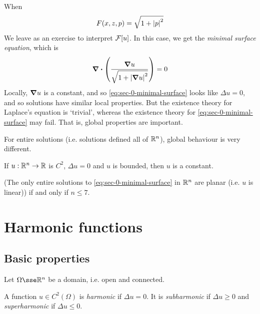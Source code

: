 \documentclass{article}
\begin{document}
\begin{example}
     When
    \[F(x, z, p) = \sqrt{1 + \abs{p}^2}\]
    We leave as an exercise to interpret \(\mathcal{F}[u]\). In this case, we get the \emph{minimal surface equation}, which is
    \begin{equation}
        \label{eq:sec-0-minimal-surface}
        \grad\vdot\left(\frac{\grad u}{\sqrt{1 + \abs{\grad u}^2}}\right) = 0
    \end{equation}
    Locally, \(\grad u\) is a constant, and so \cref{eq:sec-0-minimal-surface} looks like \(\Delta u = 0\), and so solutions have similar local properties. But the existence theory for Laplace's equation is `trivial', whereas the existence theory for \cref{eq:sec-0-minimal-surface} may fail. That is, global properties are important.

    For entire solutions (i.e. solutions defined all of \(\mathbb{R}^n\)), global behaviour is very different.
\end{example}

\begin{theorem}
    [Liouville] If \(u : \mathbb{R}^n \to \mathbb{R}\) is \(C^2\), \(\Delta u = 0\) and \(u\) is bounded, then \(u\) is a constant.
\end{theorem}

\begin{theorem}
    [Bernstein] (The only entire solutions to \cref{eq:sec-0-minimal-surface} in \(\mathbb{R}^n\) are planar (i.e. \(u\) is linear)) if and only if \(n \le 7\).
\end{theorem}

\section{Harmonic functions}

\subsection{Basic properties}

Let \(\Omega \sse \R^n\) be a domain, i.e. open and connected.

\begin{definition}
    A function \(u \in C^2(\Omega)\) is \emph{harmonic} if \(\Delta u = 0\). It is \emph{subharmonic} if \(\Delta u \ge 0\) and \emph{superharmonic} if \(\Delta u \le 0\).
\end{definition}
\end{document}
